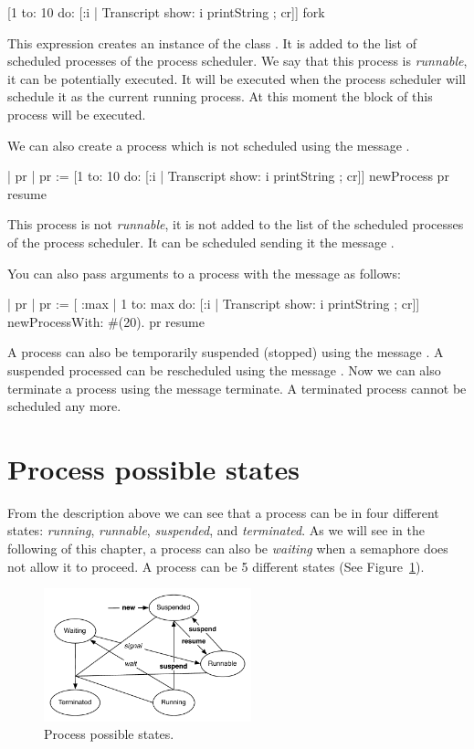 \documentclass[a4paper,10pt,twoside]{book}
\begin{document}
\begin{code}{}
[1 to: 10 do: [:i | Transcript show: i  printString ; cr]] fork
\end{code}

This expression creates an instance of the class . It is added to the list of scheduled processes of the process scheduler. We say that this process is \emph{runnable}, it can be potentially executed. It will be executed when the process scheduler will schedule it as the current running process. At this moment the block of this process will be executed. 


We can also create a process which is not scheduled using the message . 

\begin{code}{}
| pr | 
pr := [1 to: 10 do: [:i | Transcript show: i  printString ; cr]] newProcess
pr resume
\end{code}

This process is not \emph{runnable}, it is not added to the list of the scheduled processes of the process scheduler. It can be scheduled sending it the message . 

You can also pass arguments to a process with the message  as follows: 

\begin{code}{}
| pr | 
pr := [ :max |
		1 to: max do: [:i | Transcript show: i  printString ; cr]] newProcessWith: #(20).
pr resume
\end{code}



A process can also be temporarily suspended (\ie stopped) using the message . A suspended processed can be rescheduled using the message . Now we can also terminate a process using the message terminate. 
A terminated process cannot be scheduled any more. 

\section{Process possible states}
From the description above we can see that a process can be in four different states: \emph{running}, \emph{runnable}, \emph{suspended}, and \emph{terminated}. As we will see in the following of this chapter, a process can also be \emph{waiting} when a semaphore does not allow it to proceed. A process can be 5 different states (See Figure~\ref{fig:processState}).

\begin{figure}
\begin{center}
\includegraphics[width=6cm]{ProcessState}
\caption{Process possible states.\label{fig:processState}}
\end{center}
\end{figure}
\end{document}
